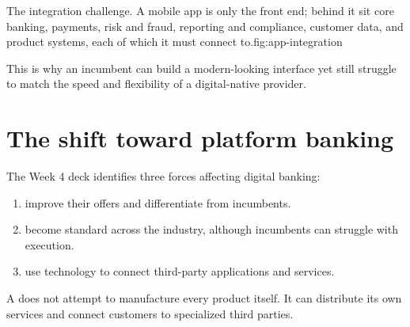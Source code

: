 \begin{utpfig}{The integration challenge. A mobile app is only the front end; behind it sit core banking, payments, risk and fraud, reporting and compliance, customer data, and product systems, each of which it must connect to.}{fig:app-integration}
\end{utpfig}

This is why an incumbent can build a modern-looking interface yet still struggle to match the speed and flexibility of a digital-native provider.

\section{The shift toward platform banking}

The Week 4 deck identifies three forces affecting digital banking:

\begin{enumerate}
  \item {} improve their offers and differentiate from incumbents.
  \item {} become standard across the industry, although incumbents can struggle with execution.
  \item {} use technology to connect third-party applications and services.
\end{enumerate}

A  does not attempt to manufacture every product itself. It can distribute its own services and connect customers to specialized third parties.

